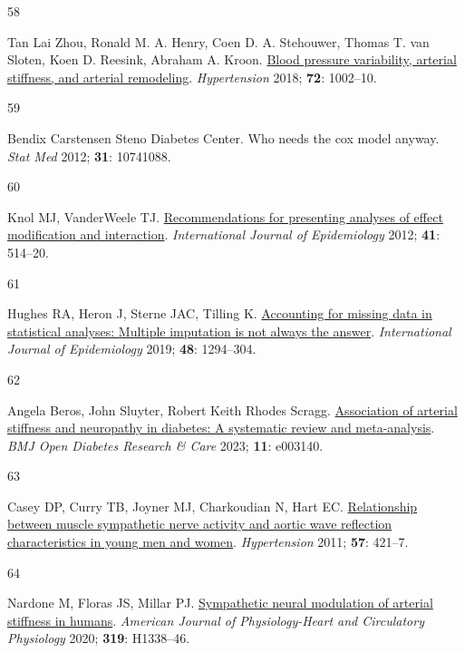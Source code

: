 \documentclass[
  a4paper,
  headsepline=true,
  open=any]{scrbook}
\newlength{\cslhangindent}
\newlength{\csllabelwidth}
\newlength{\cslentryspacingunit} %
\newenvironment{CSLReferences}[2] %
 {%
  \setlength{\parindent}{0pt}
  \ifodd #1
  \let\oldpar\par
  \def\par{\hangindent=\cslhangindent\oldpar}
  \fi
  \setlength{\parskip}{#2\cslentryspacingunit}
 }%
 {}
\newcommand{\CSLLeftMargin}[1]{\parbox[t]{\csllabelwidth}{#1}}
\newcommand{\CSLRightInline}[1]{\parbox[t]{\linewidth - \csllabelwidth}{#1}\break}
\begin{document}
\begin{CSLReferences}{0}{0}
\leavevmode{}%
\CSLLeftMargin{58 }%
\CSLRightInline{Tan Lai Zhou, Ronald M. A. Henry, Coen D. A. Stehouwer,
Thomas T. van Sloten, Koen D. Reesink, Abraham A. Kroon.
\href{https://doi.org/doi:10.1161/HYPERTENSIONAHA.118.11325}{Blood
pressure variability, arterial stiffness, and arterial remodeling}.
\emph{Hypertension} 2018; \textbf{72}: 1002--10.}

\leavevmode{}%
\CSLLeftMargin{59 }%
\CSLRightInline{Bendix Carstensen Steno Diabetes Center. Who needs the
cox model anyway. \emph{Stat Med} 2012; \textbf{31}: 10741088.}

\leavevmode{}%
\CSLLeftMargin{60 }%
\CSLRightInline{Knol MJ, VanderWeele TJ.
\href{https://doi.org/10.1093/ije/dyr218}{Recommendations for presenting
analyses of effect modification and interaction}. \emph{International
Journal of Epidemiology} 2012; \textbf{41}: 514--20.}

\leavevmode{}%
\CSLLeftMargin{61 }%
\CSLRightInline{Hughes RA, Heron J, Sterne JAC, Tilling K.
\href{https://doi.org/10.1093/ije/dyz032}{Accounting for missing data in
statistical analyses: Multiple imputation is not always the answer}.
\emph{International Journal of Epidemiology} 2019; \textbf{48}:
1294--304.}

\leavevmode{}%
\CSLLeftMargin{62 }%
\CSLRightInline{Angela Beros, John Sluyter, Robert Keith Rhodes Scragg.
\href{https://doi.org/10.1136/bmjdrc-2022-003140}{Association of
arterial stiffness and neuropathy in diabetes: A systematic review and
meta-analysis}. \emph{BMJ Open Diabetes Research \& Care} 2023;
\textbf{11}: e003140.}

\leavevmode{}%
\CSLLeftMargin{63 }%
\CSLRightInline{Casey DP, Curry TB, Joyner MJ, Charkoudian N, Hart EC.
\href{https://doi.org/10.1161/HYPERTENSIONAHA.110.164517}{Relationship
between muscle sympathetic nerve activity and aortic wave reflection
characteristics in young men and women}. \emph{Hypertension} 2011;
\textbf{57}: 421--7.}

\leavevmode{}%
\CSLLeftMargin{64 }%
\CSLRightInline{Nardone M, Floras JS, Millar PJ.
\href{https://doi.org/10.1152/ajpheart.00734.2020}{Sympathetic neural
modulation of arterial stiffness in humans}. \emph{American Journal of
Physiology-Heart and Circulatory Physiology} 2020; \textbf{319}:
H1338--46.}


\end{CSLReferences}
\end{document}
